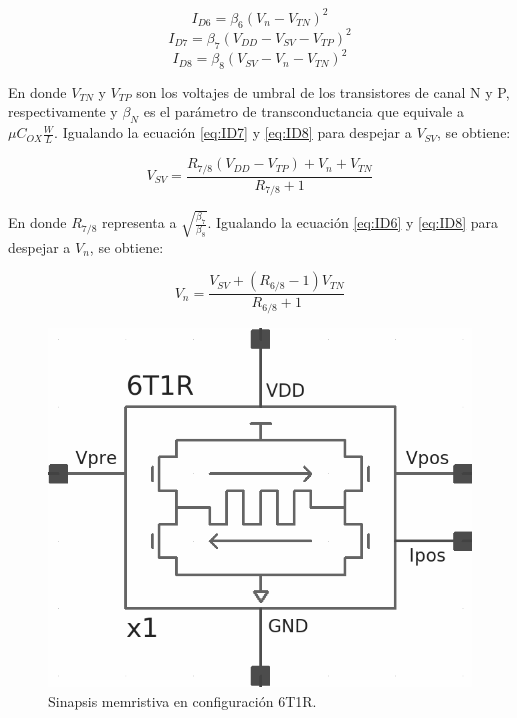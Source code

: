 \documentclass[conference]{IEEEtran}
\begin{document}
\begin{equation}
	I_{D6} = \beta_{6}\left(V_{n}-V_{TN}\right)^{2}
	\label{eq:ID6}
\end{equation}
\begin{equation}
	I_{D7} = \beta_{7}\left(V_{DD}-V_{SV}-V_{TP}\right)^{2}
	\label{eq:ID7}
\end{equation}
\begin{equation}
	I_{D8} = \beta_{8}\left(V_{SV}-V_{n}-V_{TN}\right)^{2}
	\label{eq:ID8}
\end{equation}

En donde $V_{TN}$ y $V_{TP}$ son los voltajes de umbral de los transistores de canal N y P, respectivamente y $\beta_{N}$ es el parámetro de transconductancia que equivale a $\mu C_{OX} \frac{W}{L}$. Igualando la ecuación \ref{eq:ID7} y \ref{eq:ID8} para despejar a $V_{SV}$, se obtiene:

\begin{equation}
	V_{SV} = \frac{R_{7/8}(V_{DD}-V_{TP})+V_{n}+V_{TN}}{R_{7/8}+1}
	\label{eq:VSV1}
\end{equation}

En donde $R_{7/8}$ representa a $\sqrt{\frac{\beta_{7}}{\beta_{8}}}$. Igualando la ecuación \ref{eq:ID6} y \ref{eq:ID8} para despejar a $V_{n}$, se obtiene:

\begin{equation}
	V_{n} = \frac{V_{SV}+(R_{6/8}-1)V_{TN}}{R_{6/8}+1}
	\label{eq:Vn}
\end{equation}

\begin{figure}[ht]
	\centering
	\includegraphics[scale=0.2]{img/6T1R.png}
	\caption{Sinapsis memristiva en configuración 6T1R.
		\label{fig:6T1R}}
\end{figure}
\end{document}
